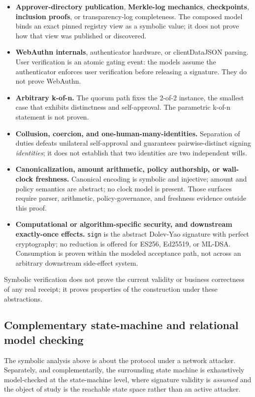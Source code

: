 \documentclass[11pt]{article}
\newcommand{\code}[1]{\texttt{#1}}
\begin{document}
\begin{itemize}[leftmargin=*]
\item \textbf{Approver-directory publication}, \textbf{Merkle-log mechanics},
\textbf{checkpoints}, \textbf{inclusion proofs}, or transparency-log completeness.
The composed model binds an exact pinned registry view as a symbolic value; it does
not prove how that view was published or discovered.
\item \textbf{WebAuthn internals}, authenticator hardware, or clientDataJSON
parsing. User verification is an atomic gating event: the models assume the
authenticator enforces user verification before releasing a signature. They do not
prove WebAuthn.
\item \textbf{Arbitrary k-of-n.} The quorum path fixes the 2-of-2 instance, the
smallest case that exhibits distinctness and self-approval. The parametric k-of-n
statement is not proven.
\item \textbf{Collusion, coercion, and one-human-many-identities.} Separation of
duties defeats unilateral self-approval and guarantees pairwise-distinct signing
\emph{identities}; it does not establish that two identities are two independent
wills.
\item \textbf{Canonicalization, amount arithmetic, policy authorship, or wall-clock
freshness.} Canonical encoding is symbolic and injective; amount and policy
semantics are abstract; no clock model is present. Those surfaces require parser,
arithmetic, policy-governance, and freshness evidence outside this proof.
\item \textbf{Computational or algorithm-specific security, and downstream
exactly-once effects.} \code{sign} is the abstract Dolev-Yao signature with perfect
cryptography; no reduction is offered for ES256, Ed25519, or ML-DSA. Consumption is
proven within the modeled acceptance path, not across an arbitrary downstream
side-effect system.
\end{itemize}

Symbolic verification does not prove the current validity or business correctness
of any real receipt; it proves properties of the construction under these
abstractions.

\subsection{Complementary state-machine and relational model checking}

The symbolic analysis above is about the protocol under a network attacker.
Separately, and complementarily, the surrounding state machine is exhaustively
model-checked at the state-machine level, where signature validity is
\emph{assumed} and the object of study is the reachable state space rather than an
active attacker.
\end{document}
